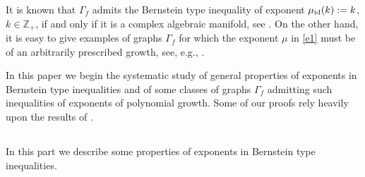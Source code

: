 \documentclass[11pt, oneside]{amsart}
\begin{document}
It is known that $\Gamma_f$ admits the Bernstein type inequality of exponent  $\mu_{{\rm id}}(k):=k$, $k\in\mathbb Z_+$, if and only if it is a complex algebraic manifold, see \cite{S}. On the other hand, it is easy to give examples of graphs $\Gamma_f$ for which the exponent $\mu$ in \eqref{e1} must be of an arbitrarily prescribed growth, see, e.g., \cite[p.\,140]{BBL}.  

In this paper we begin the systematic study of general properties of exponents in Bernstein type inequalities and of some classes of graphs $\Gamma_f$ admitting such inequalities of exponents of polynomial growth. Some of our proofs rely heavily upon the results of \cite{B}.
\subsection{}
In this part we describe some properties of exponents in Bernstein type inequalities.\smallskip
\end{document}
